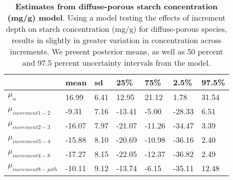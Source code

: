 \documentclass{article}\usepackage[]{graphicx}\usepackage[]{color}
\begin{document}
\begin{table}[ht]
\centering
\caption{\textbf{Estimates from diffuse-porous starch concentration (mg/g) model}. Using a model testing the effects of increment depth on starch concentration (mg/g) for diffuse-porous species, results in slightly in greater variation in concentration across increments. We present posterior means, as well as 50 percent and 97.5 percent uncertainty intervals from the model.} 
\label{tab:lat}
\begingroup\footnotesize
\begin{tabular}{|p{}|p{}|p{}|p{}|p{}|p{}|p{}|}
  \hline
 & mean & sd & 25\% & 75\% & 2.5\% & 97.5\% \\ 
  \hline
$\mu_{\alpha}$ & 16.99 & 6.41 & 12.95 & 21.12 & 1.78 & 31.54 \\ 
  $\mu_{increment 1-2}$ & -9.31 & 7.16 & -13.41 & -5.00 & -28.33 & 6.51 \\ 
  $\mu_{increment 2-3}$ & -16.07 & 7.97 & -21.07 & -11.26 & -34.47 & 3.39 \\ 
  $\mu_{increment 3-4}$ & -15.88 & 8.10 & -20.69 & -10.98 & -36.16 & 2.40 \\ 
  $\mu_{increment 4-8}$ & -17.27 & 8.15 & -22.05 & -12.37 & -36.82 & 2.49 \\ 
  $\mu_{increment 8-pith}$ & -10.11 & 9.12 & -13.74 & -6.15 & -35.11 & 12.48 \\ 
   \hline
\end{tabular}
\endgroup
\end{table}
\end{document}
